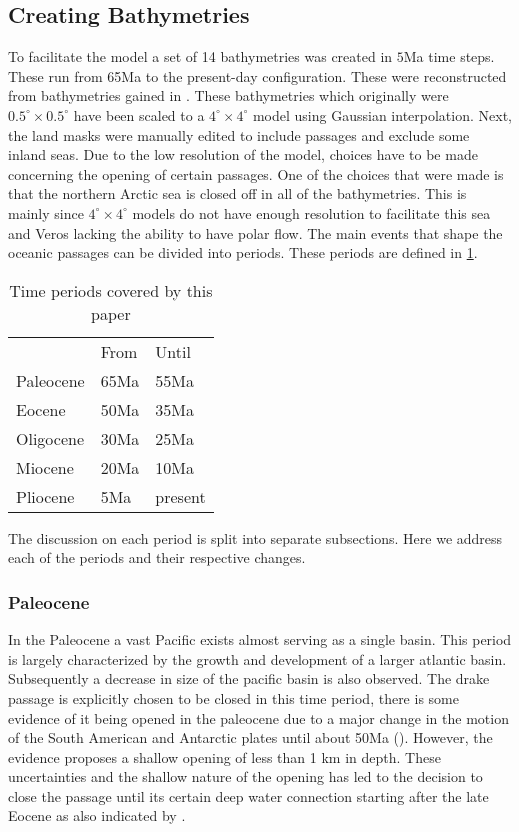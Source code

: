 \subsection{Creating Bathymetries} \label{sec:bathys}
To facilitate the model a set of 14 bathymetries was created in $5$Ma time steps. These run from 65Ma to the present-day configuration. These were reconstructed from bathymetries gained in \cite{Baatsen2016Aug}.
These bathymetries which originally were $0.5^{\circ} \times0.5^{\circ}$ have been scaled to a $4^{\circ} \times 4^{\circ}$  model using Gaussian interpolation. Next, the land masks were manually edited to include passages and exclude some inland seas. Due to the low resolution of the model, choices have to be made concerning the opening of certain passages. One of the choices that were made is that the northern Arctic sea is closed off in all of the bathymetries. This is mainly since $4^{\circ} \times 4^{\circ}$ models do not have enough resolution to facilitate this sea and Veros lacking the ability to have polar flow.
The main events that shape the oceanic passages can be divided into periods. These periods are defined in \cref{tab:timeperiods}.
\begin{table}[H]
\centering
	\begin{tabular}{lll}
		&From &Until \\
		Paleocene & 65Ma&55Ma    \\
		Eocene    & 50Ma&35Ma     \\
		Oligocene & 30Ma&25Ma    \\
		Miocene   & 20Ma & 10Ma  \\
		Pliocene & 5Ma & present
	\end{tabular}
\caption{Time periods covered by this paper}
\label{tab:timeperiods}
\end{table}
The discussion on each period is split into separate subsections. Here we address each of the periods and their respective changes.

\subsubsection{Paleocene}
In the Paleocene a vast Pacific exists almost serving as a single basin. This period is largely characterized by the growth and development of a larger atlantic basin. Subsequently a decrease in size of the pacific basin is also observed. The drake passage is explicitly chosen to be closed in this time period, there is some evidence of it being opened in the paleocene due to a major change in the motion of the South American and Antarctic plates until about 50Ma (\cite{Livermore2005Jul}). However, the evidence proposes a shallow opening of less than 1 km in depth. These uncertainties and the shallow nature of the opening has led to the decision to close the passage until its certain deep water connection starting after the late Eocene as also indicated by \cite{Livermore2005Jul}.

